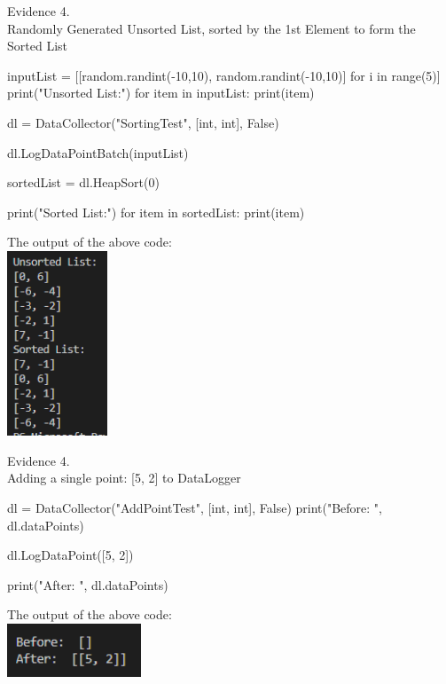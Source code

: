 \setcounter{magicrownumbers}{0}
\begin{center}
    {\large Evidence 4.\rn } \\ 
    \vspace{0.3cm}
    Randomly Generated Unsorted List, sorted by the 1st Element to form the Sorted List \\

    \begin{pythoncode}
inputList = [[random.randint(-10,10), random.randint(-10,10)] for i in range(5)]
print("Unsorted List:")
for item in inputList:
print(item)

dl = DataCollector("SortingTest", [int, int], False)

dl.LogDataPointBatch(inputList)

sortedList = dl.HeapSort(0)

print("Sorted List:")
for item in sortedList:
print(item)
    \end{pythoncode}

    The output of the above code: \\
    \includegraphics[width=3cm]{Images/Testing/T4.1.1.PNG} \\

    \vspace{1cm}

    {\large Evidence 4.\rn } \\ 
    \vspace{0.3cm}
    Adding a single point: [5, 2] to DataLogger \\
    \begin{pythoncode}
dl = DataCollector("AddPointTest", [int, int], False)
print("Before: ", dl.dataPoints)

dl.LogDataPoint([5, 2])

print("After: ", dl.dataPoints)
    \end{pythoncode}

    The output of the above code: \\
    \includegraphics[width=4cm]{Images/Testing/T4.2.1.PNG} \\
    \vspace{1cm}


\end{center}
